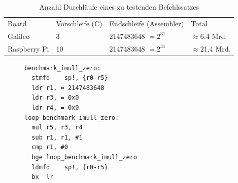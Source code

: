 \begin{table}[h]
\center
\begin{tabular}{ |l|l|l|l| }
\hline
Board & Vorschleife (C) & Endschleife (Assembler) & Total \\ \hhline{|=|=|=|=|}
Galileo & 3 & 2147483648 $=2^{31}$ & $\approx$6.4 Mrd.  \\ \hline
Raspberry Pi & 10 & 2147483648 $=2^{31}$ & $\approx$21.4 Mrd. \\ \hline
\end{tabular}
\caption{Anzahl Durchläufe eines zu testenden Befehlssatzes}
\label{tab:benchmark_loop_size}
\end{table}


\begin{figure}[b]
\begin{minipage}{\linewidth}
\lstset{language=[x64]Assembler}
\begin{lstlisting}[label={list:asm_benchmark},caption={Benchmark in Assembler}]
benchmark_imull_zero:
  stmfd    sp!, {r0-r5}
  ldr r1, = 2147483648
  ldr r3, = 0x0
  ldr r4, = 0x0
loop_benchmark_imull_zero:
  mul r5, r3, r4
  sub r1, r1, #1
  cmp r1, #0
  bge loop_benchmark_imull_zero
  ldmfd    sp!, {r0-r5}
  bx  lr
\end{lstlisting}
\end{minipage}
\end{figure}


